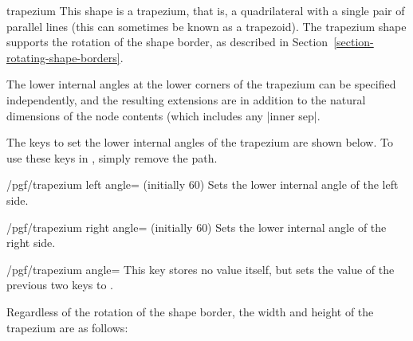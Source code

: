 \begin{shape}{trapezium}
  This shape is a trapezium, that is, a quadrilateral with a single
  pair of parallel lines (this can sometimes be known as a trapezoid).
  The trapezium shape supports the rotation of the shape border, as
  described in Section~\ref{section-rotating-shape-borders}.

  The lower internal angles at the lower corners of the trapezium can
  be specified independently, and the resulting extensions are in
  addition to the natural dimensions of the node contents (which
  includes any |inner sep|.
	
\begin{codeexample}[]
\end{codeexample}


  The \pgfname{} keys to set the lower internal angles of the trapezium
  are shown below.
  To use these keys in \tikzname, simply remove the  path.
	
  \begin{key}{/pgf/trapezium left angle= (initially 60)}
    Sets the lower internal angle of the left side.
  \end{key}

  \begin{key}{/pgf/trapezium right angle= (initially 60)}
    Sets the lower internal angle of the right side.
  \end{key}

  \begin{stylekey}{/pgf/trapezium angle=}
    This key stores no value itself, but sets the value of the
    previous two keys to .
  \end{stylekey}

  Regardless of the rotation of the shape border, the width
  and height of the trapezium are as follows:

\begin{codeexample}[]
\end{codeexample}


\end{shape}
